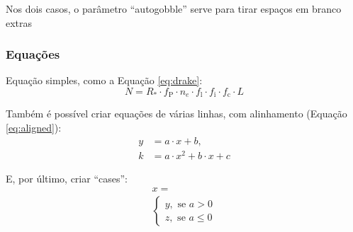         Nos dois casos, o parâmetro ``autogobble'' serve para tirar espaços em branco extras

      \subsubsection{Equações}
        Equação simples, como a Equação \eqref{eq:drake}:
        \begin{equation}
          N = R_* \cdot f_\text{P} \cdot n_e \cdot f_\text{l} \cdot f_\text{i} \cdot f_\text{c} \cdot L
          \label{eq:drake}
        \end{equation}

        Também é possível criar equações de várias linhas, com alinhamento (Equação \eqref{eq:aligned}):
        \begin{align}
          y &= a \cdot x + b, \\
          k &= a \cdot x^2 + b \cdot x + c
          \label{eq:aligned}
        \end{align}

        E, por último, criar ``cases'':
        \begin{align}
          x = \\
          \begin{cases}
            y,\text{ se } a > 0 \\
            z,\text{ se } a \leq 0
          \end{cases}
        \end{align}







